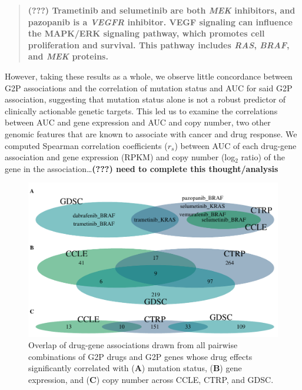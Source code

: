 \documentclass[man,floatsintext]{apa6}
\begin{document}
\begin{quote}
\textbf{(???) Trametinib and selumetinib are both \emph{MEK} inhibitors,
and pazopanib is a \emph{VEGFR} inhibitor. VEGF signaling can influence
the MAPK/ERK signaling pathway, which promotes cell proliferation and
survival. This pathway includes \emph{RAS}, \emph{BRAF}, and \emph{MEK}
proteins.}
\end{quote}

However, taking these results as a whole, we observe little concordance
between G2P associations and the correlation of mutation status and AUC
for said G2P association, suggesting that mutation status alone is not a
robust predictor of clinically actionable genetic targets. This led us
to examine the correlations between AUC and gene expression and AUC and
copy number, two other genomic features that are known to associate with
cancer and drug response. We computed Spearman correlation coefficients
(\(r_s\)) between AUC of each drug-gene association and gene expression
(RPKM) and copy number (log\(_2\) ratio) of the gene in the
association\ldots{}\textbf{(???) need to complete this thought/analysis}







\begin{figure}
\centering
\includegraphics{./plots/manuscript/drugscreen_venns.pdf}
\caption{\label{fig:drug-venn}Overlap of drug-gene associations drawn from all
pairwise combinations of G2P drugs and G2P genes whose drug effects
significantly correlated with (\textbf{A}) mutation status, (\textbf{B})
gene expression, and (\textbf{C}) copy number across CCLE, CTRP, and
GDSC.}
\end{figure}
\end{document}

